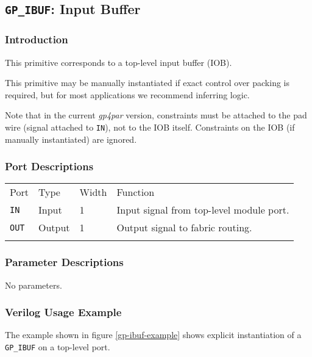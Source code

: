 \documentclass[11pt]{article}
\newcommand{\namestyle}[1]{\textit{#1}}
\newcommand{\tokenstyle}[1]{\texttt{#1}}
\newcommand{\whenstyle}[1]{{\fontseries{sb}\selectfont#1}}
\newcommand{\thinhline}{\Xhline{1\arrayrulewidth}}
\newcommand{\thickhline}{\Xhline{2.5\arrayrulewidth}}
\begin{document}

\pagebreak
\subsection{\tokenstyle{GP\_IBUF}: Input Buffer}
\label{gp-ibuf}

\subsubsection{Introduction}
This primitive corresponds to a top-level input buffer (IOB).

This primitive may be manually instantiated if exact control over packing is required, but for most applications we
recommend inferring logic.

Note that in the current \namestyle{gp4par} version, constraints must be attached to the pad wire (signal attached to \tokenstyle{IN}), not
to the IOB itself. Constraints on the IOB (if manually instantiated) are ignored.

\subsubsection{Port Descriptions}

\begin{tabularx}{\textwidth}{lllX}
\thinhline
\whenstyle{Port} & \whenstyle{Type} & \whenstyle{Width} & \whenstyle{Function} \\
\thickhline
\tokenstyle{IN} & Input & 1 & Input signal from top-level module port. \\
\thinhline
\tokenstyle{OUT} & Output & 1 & Output signal to fabric routing. \\
\thinhline
\end{tabularx}

\subsubsection{Parameter Descriptions}

No parameters.

\subsubsection{Verilog Usage Example}

The example shown in figure \ref{gp-ibuf-example} shows explicit instantiation of a \tokenstyle{GP\_IBUF} on a top-level port.
\end{document}
